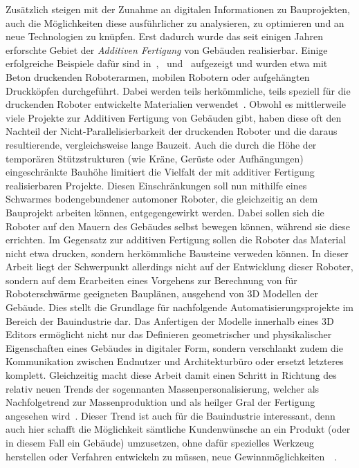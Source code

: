 Zusätzlich steigen mit der Zunahme an digitalen Informationen zu Bauprojekten, auch die Möglichkeiten diese ausführlicher zu analysieren, zu optimieren und an neue Technologien zu knüpfen.
Erst dadurch wurde das seit einigen Jahren erforschte Gebiet der \textit{Additiven Fertigung} von Gebäuden realisierbar.
Einige erfolgreiche Beispiele dafür sind in~\cite{AdditiveManufactoringDelgado},~\cite{AdditiveManufacturingUsingMobileRobots} und~\cite{Tankova2020} aufgezeigt und wurden etwa mit Beton druckenden Roboterarmen, mobilen Robotern oder aufgehängten Druckköpfen durchgeführt.
Dabei werden teils herkömmliche, teils speziell für die druckenden Roboter entwickelte Materialien verwendet~\cite{Tankova2020}.
Obwohl es mittlerweile viele Projekte zur Additiven Fertigung von Gebäuden gibt, haben diese oft den Nachteil der Nicht-Parallelisierbarkeit der druckenden Roboter und die daraus resultierende, vergleichsweise lange Bauzeit.
Auch die durch die Höhe der temporären Stützstrukturen (wie Kräne, Gerüste oder Aufhängungen) eingeschränkte Bauhöhe limitiert die Vielfalt der mit additiver Fertigung realisierbaren Projekte.
Diesen Einschränkungen soll nun mithilfe eines Schwarmes bodengebundener automoner Roboter, die gleichzeitig an dem Bauprojekt arbeiten können, entgegengewirkt werden.
Dabei sollen sich die Roboter auf den Mauern des Gebäudes selbst bewegen können, während sie diese errichten.
Im Gegensatz zur additiven Fertigung sollen die Roboter das Material nicht etwa drucken, sondern herkömmliche Bausteine verweden können.
In dieser Arbeit liegt der Schwerpunkt allerdings nicht auf der Entwicklung dieser Roboter, sondern auf dem Erarbeiten eines Vorgehens zur Berechnung von für Roboterschwärme geeigneten Bauplänen, ausgehend von 3D Modellen der Gebäude.
Dies stellt die Grundlage für nachfolgende Automatisierungsprojekte im Bereich der Bauindustrie dar.
Das Anfertigen der Modelle innerhalb eines 3D Editors ermöglicht nicht nur das Definieren geometrischer und physikalischer Eigenschaften eines Gebäudes in digitaler Form, sondern verschlankt zudem die Kommunikation zwischen Endnutzer und Architekturbüro oder ersetzt letzteres komplett.
Gleichzeitig macht diese Arbeit damit einen Schritt in Richtung des relativ neuen Trends der sogennanten Massenpersonalisierung, welcher als Nachfolgetrend zur Massenproduktion und als \glqq{}heilger Gral\grqq{} der Fertigung angesehen wird~\cite{MassCustomHolyGrail}.
Dieser Trend ist auch für die Bauindustrie interessant, denn auch hier schafft die Möglichkeit sämtliche Kundenwünsche an ein Produkt (oder in diesem Fall ein Gebäude) umzusetzen, ohne dafür spezielles Werkzeug herstellen oder Verfahren entwickeln zu müssen, neue Gewinnmöglichkeiten~\cite{Jensen2018}~\cite{Jensen2015}.
